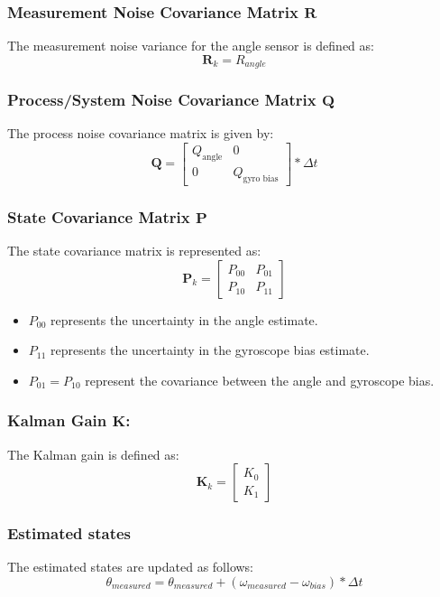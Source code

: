 \subsubsection{Measurement Noise Covariance Matrix $\mathbf{R}$}
The measurement noise variance for the angle sensor is defined as:
$$ \mathbf{R}_{k} = R_{angle} $$

\subsubsection{Process/System Noise Covariance Matrix $\mathbf{Q}$}
The process noise covariance matrix is given by:
$$
\mathbf{Q} = \begin{bmatrix} Q_{\text{angle}} & 0 \\ 0 & Q_{\text{gyro bias}} \end{bmatrix} * \Delta t
$$

\subsubsection{State Covariance Matrix $\mathbf{P}$}
The state covariance matrix is represented as:
$$
\mathbf{P}_k = \begin{bmatrix} P_{00} & P_{01} \\ P_{10} & P_{11} \end{bmatrix}
$$
\begin{itemize}
	\item $P_{00}$ represents the uncertainty in the angle estimate.
	\item $P_{11}$ represents the uncertainty in the gyroscope bias estimate.
	\item $P_{01} = P_{10}$ represent the covariance between the angle and gyroscope bias.
\end{itemize}

\subsubsection{Kalman Gain $\mathbf{K}$:}
The Kalman gain is defined as:
$$
\mathbf{K}_k = \begin{bmatrix} K_{0} \\ K_{1} \end{bmatrix}
$$

\subsubsection{Estimated states}
The estimated states are updated as follows:
$$
\theta_{measured} = \theta_{measured} + (\omega_{measured} - \omega_{bias}) * \Delta t
$$

